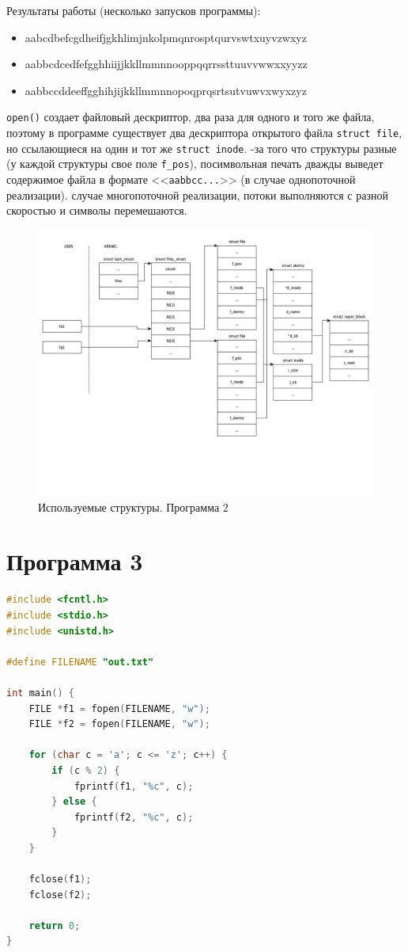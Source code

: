 \documentclass[12pt]{report}
\begin{document}
Результаты работы (несколько запусков программы): 
\begin{itemize}
	\item aabcdbefcgdheifjgkhlimjnkolpmqnrosptqurvswtxuyvzwxyz
	\item aabbcdcedfefgghhiijjkkllmmnnooppqqrrssttuuvvwwxxyyzz
	\item aabbccddeeffgghihjijkkllmmnnopoqprqsrtsutvuwvxwyxzyz
\end{itemize}


 \texttt{open()} создает файловый дескриптор, два раза для одного и того же файла, поэтому в программе существует два дескриптора открытого файла \texttt{struct file}, но ссылающиеся на один и тот же \texttt{struct inode}.
-за того что структуры разные (у каждой структуры свое поле \texttt{f\_pos}), посимвольная печать дважды выведет содержимое файла в формате <<\texttt{aabbcc...}>> (в случае однопоточной реализации).
 случае многопоточной реализации, потоки выполняются с разной скоростью и символы перемешаются.


\begin{figure}[h!]
	\centering
	\includegraphics[scale=0.4]{2.png}
	\caption{Используемые структуры. Программа 2}
	\label{png:testing:result}
\end{figure}
\newpage

\section*{Программа 3}

\begin{lstlisting}[label=first,caption=Программа 3, language=C]
#include <fcntl.h>
#include <stdio.h>
#include <unistd.h>

#define FILENAME "out.txt"

int main() {
	FILE *f1 = fopen(FILENAME, "w");
	FILE *f2 = fopen(FILENAME, "w");
	
	for (char c = 'a'; c <= 'z'; c++) {
		if (c % 2) {
			fprintf(f1, "%c", c);
		} else {
			fprintf(f2, "%c", c);
		}
	}
	
	fclose(f1);
	fclose(f2);
	
	return 0;
}
\end{lstlisting}
\end{document}
